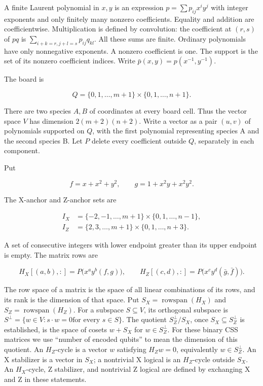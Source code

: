 \documentclass{article}
\begin{document}
A finite Laurent polynomial in \(x,y\) is an expression
\(p=\sum  p_{ij}x^iy^j\) with integer exponents and only finitely many
nonzero coefficients. Equality and addition are coefficientwise.
Multiplication is defined by convolution: the coefficient at \((r,s)\)
of \(pq\) is \(\sum _{i+k=r,j+l=s} p_{ij}q_{kl}\). All these sums are
finite. Ordinary polynomials have only nonnegative exponents. A nonzero
coefficient is one. The support is the set of its nonzero coefficient
indices. Write \(\bar p(x,y)=p(x^{-1},y^{-1})\).

The board is

\begin{equation}
 Q=\{0,1,\ldots,m+1\}\times\{0,1,\ldots,n+1\}.
\end{equation}

There are two species \(A,B\) of coordinates at every board cell. Thus
the vector space \(V\) has dimension \(2(m+2)(n+2)\). Write a vector as
a pair \((u,v)\) of polynomials supported on \(Q\), with the first
polynomial representing species A and the second species B. Let \(P\)
delete every coefficient outside \(Q\), separately in each component.

Put

\begin{equation}
 f=x+x^2+y^2,\qquad g=1+x^2y+x^2y^2.
\end{equation}

The X-anchor and Z-anchor sets are

\begin{equation}
\begin{aligned}
 I_X&=\{-2,-1,\ldots,m+1\}\times\{0,1,\ldots,n-1\},\\
 I_Z&=\{2,3,\ldots,m+1\}\times\{0,1,\ldots,n+3\}.
\end{aligned}
\end{equation}

A set of consecutive integers with lower endpoint greater than its upper
endpoint is empty. The matrix rows are

\begin{equation}
 H_X[(a,b),:]=P\bigl(x^ay^b(f,g)\bigr),\qquad
 H_Z[(c,d),:]=P\bigl(x^cy^d(\bar g,\bar f)\bigr).
\end{equation}

The row space of a matrix is the space of all linear combinations of its
rows, and its rank is the dimension of that space. Put
\(S_X=\operatorname{rowspan}(H_X)\) and
\(S_Z=\operatorname{rowspan}(H_Z)\). For a subspace \(S\subseteq V\),
its orthogonal subspace is
\(S^\perp=\{w\in V : s\cdot w=0 \text{for every } s\in S\}\). The
quotient \(S_Z^\perp/S_X\), once \(S_X\subseteq S_Z^\perp\) is
established, is the space of cosets \(w+S_X\) for \(w\in S_Z^\perp\).
For these binary CSS matrices we use ``number of encoded qubits'' to
mean the dimension of this quotient. An \(H_Z\)-cycle is a vector
\(w\) satisfying \(H_Zw=0\), equivalently \(w\in S_Z^\perp\).
An X stabilizer is a vector in \(S_X\); a nontrivial X logical is an
\(H_Z\)-cycle outside \(S_X\). An \(H_X\)-cycle, Z stabilizer, and
nontrivial Z logical are defined by exchanging X and Z in these statements.
\end{document}
